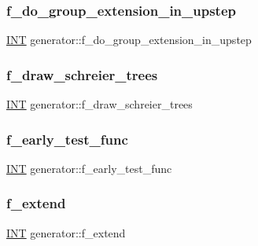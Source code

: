 \subsubsection{\texorpdfstring{f\+\_\+do\+\_\+group\+\_\+extension\+\_\+in\+\_\+upstep}{f\_do\_group\_extension\_in\_upstep}}
{\footnotesize\ttfamily \mbox{\hyperlink{galois_8h_a09fddde158a3a20bd2dcadb609de11dc}{I\+NT}} generator\+::f\+\_\+do\+\_\+group\+\_\+extension\+\_\+in\+\_\+upstep}

\mbox{\label{classgenerator_af42d776a327a41b43ea29fccbe6083e3}} 
\subsubsection{\texorpdfstring{f\+\_\+draw\+\_\+schreier\+\_\+trees}{f\_draw\_schreier\_trees}}
{\footnotesize\ttfamily \mbox{\hyperlink{galois_8h_a09fddde158a3a20bd2dcadb609de11dc}{I\+NT}} generator\+::f\+\_\+draw\+\_\+schreier\+\_\+trees}

\mbox{\label{classgenerator_a459d84a296a3b90e60fbf77fcb0a6a58}} 
\subsubsection{\texorpdfstring{f\+\_\+early\+\_\+test\+\_\+func}{f\_early\_test\_func}}
{\footnotesize\ttfamily \mbox{\hyperlink{galois_8h_a09fddde158a3a20bd2dcadb609de11dc}{I\+NT}} generator\+::f\+\_\+early\+\_\+test\+\_\+func}

\mbox{\label{classgenerator_a6b17e396df80bfb6684bbd626dce65b8}} 
\subsubsection{\texorpdfstring{f\+\_\+extend}{f\_extend}}
{\footnotesize\ttfamily \mbox{\hyperlink{galois_8h_a09fddde158a3a20bd2dcadb609de11dc}{I\+NT}} generator\+::f\+\_\+extend}

